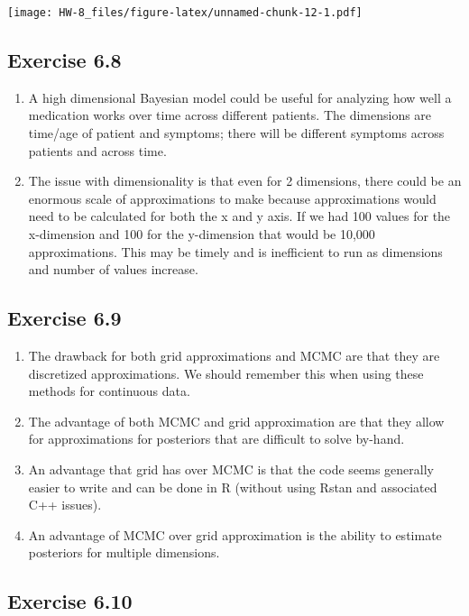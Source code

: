 \documentclass[
]{article}
\begin{document}
\texttt{[image: HW-8\_files/figure-latex/unnamed-chunk-12-1.pdf]}

\hypertarget{exercise-6.8}{%
\subsection{Exercise 6.8}\label{exercise-6.8}}

\begin{enumerate}
\def\labelenumi{\alph{enumi})}
\item
  A high dimensional Bayesian model could be useful for analyzing how
  well a medication works over time across different patients. The
  dimensions are time/age of patient and symptoms; there will be
  different symptoms across patients and across time.
\item
  The issue with dimensionality is that even for 2 dimensions, there
  could be an enormous scale of approximations to make because
  approximations would need to be calculated for both the x and y axis.
  If we had 100 values for the x-dimension and 100 for the y-dimension
  that would be 10,000 approximations. This may be timely and is
  inefficient to run as dimensions and number of values increase.
\end{enumerate}

\hypertarget{exercise-6.9}{%
\subsection{Exercise 6.9}\label{exercise-6.9}}

\begin{enumerate}
\def\labelenumi{\alph{enumi})}
\item
  The drawback for both grid approximations and MCMC are that they are
  discretized approximations. We should remember this when using these
  methods for continuous data.
\item
  The advantage of both MCMC and grid approximation are that they allow
  for approximations for posteriors that are difficult to solve by-hand.
\item
  An advantage that grid has over MCMC is that the code seems generally
  easier to write and can be done in R (without using Rstan and
  associated C++ issues).
\item
  An advantage of MCMC over grid approximation is the ability to
  estimate posteriors for multiple dimensions.
\end{enumerate}

\hypertarget{exercise-6.10}{%
\subsection{Exercise 6.10}\label{exercise-6.10}}
\end{document}
